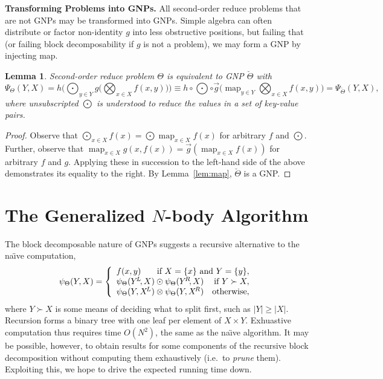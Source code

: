 \documentclass{article}
\newtheorem{lemma}{Lemma}
\newcommand{\GNP}[1][\psi]{{#1}_{\Theta}}
\DeclareMathOperator*{\map}{map}
\newcommand{\comp}{\mathbin{\circ}}
\begin{document}
{\bf Transforming Problems into GNPs.}  All second-order reduce
problems that are not GNPs may be transformed into GNPs.  Simple
algebra can often distribute or factor non-identity $g$ into less
obstructive positions, but failing that (or failing block
decomposability if $g$ is not a problem), we may form a GNP by
injecting map.
\begin{lemma}
  Second-order reduce problem $\Theta$ is equivalent to
  GNP $\breve{\Theta}$ with
  \[
  \Psi_{\Theta}(Y,X) = h \Big( \bigodot_{y \in Y} g \Big( \bigotimes_{x \in X} f(x,y) \Big) \Big) \equiv h \comp {\textstyle \bigodot} \comp \overrightarrow{g} \Big( \map_{y \in Y} \bigotimes_{x \in X} f(x,y) \Big) = \Psi_{\breve{\Theta}}(Y,X),
  \]
  where unsubscripted $\bigodot$ is understood to reduce the values in
  a set of key-value pairs.
\end{lemma}
\begin{proof}
  Observe that $\bigodot_{x \in X} f(x) = \bigodot{} \map_{x \in X}
  f(x)$ for arbitrary $f$ and $\bigodot$.  Further, observe that
  $\map_{x \in X} g(x,f(x)) = \overrightarrow{g} \left( \map_{x \in X}
  f(x) \right)$ for arbitrary $f$ and $g$.  Applying these in
  succession to the left-hand side of the above demonstrates its
  equality to the right.  By Lemma~\ref{lem:map}, $\breve{\Theta}$ is
  a GNP.
\end{proof}

\section{The Generalized $N$-body Algorithm}

The block decomposable nature of GNPs suggests a recursive alternative
to the na\"{\i}ve computation,
\[
\GNP(Y,X) = \left\{ \begin{array}{lrr}
  f(x,y) & \multicolumn{2}{r}{\mbox{if } X = \{x\} \mbox{ and } Y = \{y\},} \\
  \multicolumn{2}{l}{\GNP(Y^{\!L}\!,X) \odot \GNP(Y^{\!R}\!,X)} & \mbox{if } Y \succ X, \\
  \multicolumn{2}{l}{\GNP(Y,X^{\!L}) \otimes \GNP(Y,X^{\!R})} & \mbox{otherwise},
\end{array} \right.
\]
where $Y \succ X$ is some means of deciding what to split first, such
as $|Y| \geq |X|$.  Recursion forms a binary tree with one leaf per
element of $X \times Y$.  Exhuastive computation thus requires time
$O(N^2)$, the same as the na\"{\i}ve algorithm.  It may be possible,
however, to obtain results for some components of the recursive block
decomposition without computing them exhaustively (i.e.~to {\em prune}
them).  Exploiting this, we hope to drive the expected running time
down.
\end{document}
